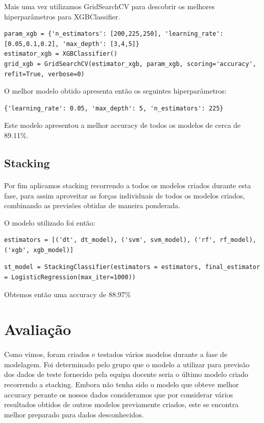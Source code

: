 Mais uma vez utilizamos GridSearchCV para descobrir os melhores hiperparâmetros para XGBClassifier.
\begin{verbatim}
param_xgb = {'n_estimators': [200,225,250], 'learning_rate': [0.05,0.1,0.2], 'max_depth': [3,4,5]}
estimator_xgb = XGBClassifier()
grid_xgb = GridSearchCV(estimator_xgb, param_xgb, scoring='accuracy', refit=True, verbose=0)
\end{verbatim}

O melhor modelo obtido apresenta então os seguintes hiperparâmetros:
\begin{verbatim}
{'learning_rate': 0.05, 'max_depth': 5, 'n_estimators': 225}
\end{verbatim}

Este modelo apresentou a melhor accuracy de todos os modelos de cerca de  89.11\%.

\subsection{Stacking}
\paragraph{}
Por fim aplicamos stacking recorrendo a todos os modelos criados durante esta fase, para assim aproveitar as forças individuais de todos os modelos criados, combinando as previsões obtidas de maneira ponderada.

O modelo utilizado foi então:
\begin{verbatim}
estimators = [('dt', dt_model), ('svm', svm_model), ('rf', rf_model), ('xgb', xgb_model)]
\end{verbatim}

\begin{verbatim}
st_model = StackingClassifier(estimators = estimators, final_estimator = LogisticRegression(max_iter=1000))
\end{verbatim}

Obtemos então uma accuracy de 88.97\%

\section{Avaliação}
\paragraph{}
Como vimos, foram criados e testados vários modelos durante a fase de modelagem. Foi determinado pelo grupo que o modelo a utilizar para previsão dos dados de teste fornecido pela equipa docente seria o último modelo criado recorrendo a stacking. Embora não tenha sido o modelo que obteve melhor accuracy perante os nossos dados consideramos que por considerar vários resultados obtidos de outros modelos previamente criados, este se encontra melhor preparado para dados desconhecidos.

